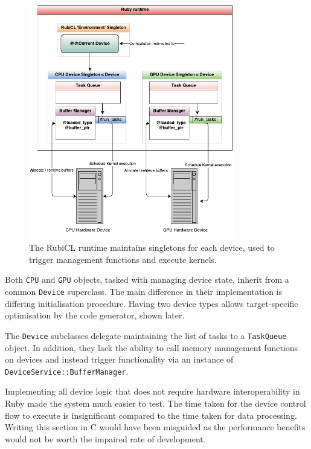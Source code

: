 \begin{figure}[h]
  \includegraphics[width=0.8\textwidth]{./figures/arch_diagram.pdf}
  \caption{The RubiCL runtime maintains singletons for each device, used to trigger management functions and execute kernels.}
  \label{fig:rubicl_devices}
\end{figure}

Both \verb|CPU| and \verb|GPU| objects, tasked with managing device state, inherit from a common \verb|Device| superclass. The main difference in their implementation is differing initialisation procedure. Having two device types allows target-specific optimisation by the code generator, shown later.

The \verb|Device| subclasses delegate maintaining the list of tasks to a \verb|TaskQueue| object. In addition, they lack the ability to call memory management functions on devices and instead trigger functionality via an instance of \verb|DeviceService::BufferManager|.

Implementing all device logic that does not require hardware interoperability in Ruby made the system much easier to test. The time taken for the device control flow to execute is insignificant compared to the time taken for data processing. Writing this section in C would have been misguided as the performance benefits would not be worth the impaired rate of development.
